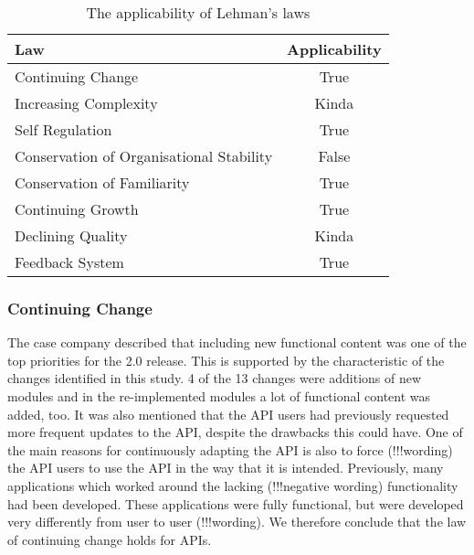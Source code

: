 \documentclass{sig-alternate}
\begin{document}
\begin{table}
       \centering
       \begin{tabular}[Ht]{|l|c|}
       \hline
       \textbf{Law} & \textbf{Applicability} \\
       \hline
       Continuing Change & True \\
       \hline
       Increasing Complexity & Kinda \\
       \hline
       Self Regulation & True \\
       \hline
       Conservation of Organisational Stability & False \\
       \hline
       Conservation of Familiarity & True \\
       \hline
       Continuing Growth & True \\
       \hline
       Declining Quality & Kinda \\
       \hline
       Feedback System & True \\
       \hline
       \end{tabular}
       \caption{The applicability of Lehman's laws}
       \label{table:lehman}
\end{table}



\subsubsection{Continuing Change}
The case company described that including new functional content was one of the top priorities for the 2.0 release. This is supported by the characteristic of the changes identified in this study. 4 of the 13 changes were additions of new modules and in the re-implemented modules a lot of functional content was added, too. It was also mentioned that the API users had previously requested more frequent updates to the API, despite the drawbacks this could have. One of the main reasons for continuously adapting the API is also to force (!!!wording) the API users to use the API in the way that it is intended. Previously, many applications which worked around the lacking (!!!negative wording) functionality had been developed. These applications were fully functional, but were developed very differently from user to user (!!!wording). We therefore conclude that the law of continuing change holds for APIs. 
\end{document}
